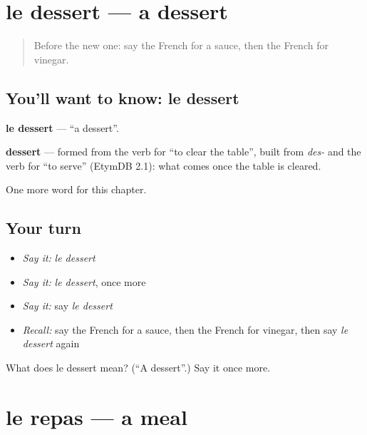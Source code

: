 \section[le dessert]{le dessert — a dessert}

\label{lesson:FR-C122-dessert}



\begin{quote}
Before the new one: say the French for a sauce, then the French for vinegar.
\end{quote}

\subsection*{You'll want to know: le dessert}
\textbf{le dessert} — \textquotedblleft{}a dessert\textquotedblright{}.

\begin{cousinweb}
\textbf{dessert} — formed from the verb for \textquotedblleft{}to clear the table\textquotedblright{}, built from \emph{des-} and the verb for \textquotedblleft{}to serve\textquotedblright{} (EtymDB 2.1): what comes once the table is cleared.
\end{cousinweb}

\begin{grammarlens}[title={What you've built}]
One more word for this chapter.
\end{grammarlens}

\subsection*{Your turn}
\begin{itemize}
\raggedright
  \item \emph{Say it:} \emph{le dessert}
  \item \emph{Say it:} \emph{le dessert}, once more
  \item \emph{Say it:} say \emph{le dessert}
  \item \emph{Recall:} say the French for a sauce, then the French for vinegar, then say \emph{le dessert} again
\end{itemize}

\begin{tcolorbox}[breakable,colback=teal!4,colframe=teal!35!black,title={Before you move on}]
What does le dessert mean? (\textquotedblleft{}A dessert\textquotedblright{}.) Say it once more.
\end{tcolorbox}
\section[le repas]{le repas — a meal}

